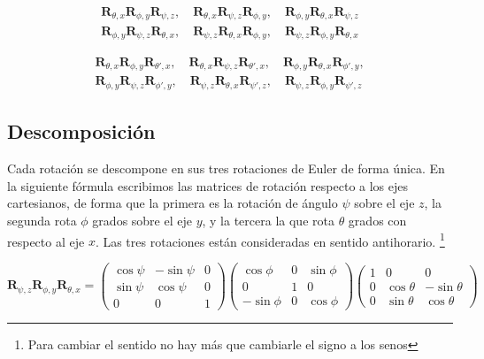 \documentclass{article}
\theoremstyle{plain}
\theoremstyle{definition}
\theoremstyle{remark}
\begin{document}
\[
\begin{aligned}
\mathbf{R}_{\theta,x}\mathbf{R}_{\phi,y}\mathbf{R}_{\psi,z}, \quad
\mathbf{R}_{\theta,x}\mathbf{R}_{\psi, z}\mathbf{R}_{\phi,y}, \quad
\mathbf{R}_{\phi, y}\mathbf{R}_{\theta, x}\mathbf{R}_{\psi,z} \\
\mathbf{R}_{\phi, y}\mathbf{R}_{\psi,z}\mathbf{R}_{\theta,x}, \quad
\mathbf{R}_{\psi, z}\mathbf{R}_{\theta, x}\mathbf{R}_{\phi, y}, \quad
\mathbf{R}_{\psi, z}\mathbf{R}_{\phi,y}\mathbf{R}_{\theta, x}
\end{aligned}
\]


\[
\begin{aligned}
\mathbf{R}_{\theta,x}\mathbf{R}_{\phi,y}\mathbf{R}_{\theta',x}, \quad
\mathbf{R}_{\theta,x}\mathbf{R}_{\psi, z}\mathbf{R}_{\theta', x}, \quad
\mathbf{R}_{\phi, y}\mathbf{R}_{\theta, x}\mathbf{R}_{\phi', y}, \\
\mathbf{R}_{\phi, y}\mathbf{R}_{\psi,z}\mathbf{R}_{\phi',y}, \quad
\mathbf{R}_{\psi, z}\mathbf{R}_{\theta,x}\mathbf{R}_{\psi',z}, \quad
\mathbf{R}_{\psi,z}\mathbf{R}_{\phi,y}\mathbf{R}_{\psi',z}
\end{aligned}
\]


\subsection{Descomposición}


Cada rotación se descompone en sus tres rotaciones de Euler de forma
única. En la siguiente fórmula escribimos las matrices de rotación
respecto a los ejes cartesianos, de forma que la primera es la
rotación de ángulo $\psi$ sobre el eje $z$, la segunda rota $\phi$
grados sobre el eje $y$, y la tercera la que rota $\theta$ grados con
respecto al eje $x$. Las tres rotaciones están consideradas en sentido
antihorario.  \footnote{Para cambiar el sentido no hay más que
  cambiarle el signo a los senos}

\[
  \mathbf{R}_{\psi,z}
  \mathbf{R}_{\phi,y}
  \mathbf{R}_{\theta,x} =
  \begin{pmatrix}
    \cos \psi & -\sin \psi & 0 \\
    \sin \psi & \cos \psi & 0 \\
    0 & 0 & 1
  \end{pmatrix}\begin{pmatrix}
      \cos \phi & 0 & \sin \phi \\
      0 & 1 & 0 \\
      -\sin \phi & 0 & \cos \phi
    \end{pmatrix}\begin{pmatrix}
    1 & 0 & 0 \\
    0 & \cos \theta & -\sin \theta \\
    0 & \sin \theta & \cos \theta
  \end{pmatrix}
\]
\end{document}
